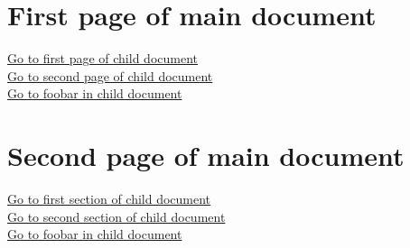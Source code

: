 \section{First page of main document}
\href{gotoe:%
  dest=page.1,embedded=hypgotoe-child.pdf%
}{Go to first page of child document}\\
\href{gotoe:%
  dest=page.2,embedded=hypgotoe-child.pdf%
}{Go to second page of child document}\\
\href{gotoe:%
  dest=foobar,embedded=hypgotoe-child.pdf%
}{Go to foobar in child document}
\newpage
\section{Second page of main document}
\href{gotoe:%
  dest=section.1,embedded=hypgotoe-child.pdf%
}{Go to first section of child document}\\
\href{gotoe:%
  dest=section.2,embedded=hypgotoe-child.pdf%
}{Go to second section of child document}\\
\href{gotoe:%
  dest=foobar,embedded=hypgotoe-child.pdf%
}{Go to foobar in child document}

\endinput
